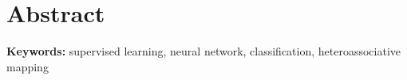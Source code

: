 \section*{Abstract}

\begin{flushleft}
  \textbf{Keywords:} supervised learning, neural network, classification, heteroassociative mapping
\end{flushleft}

